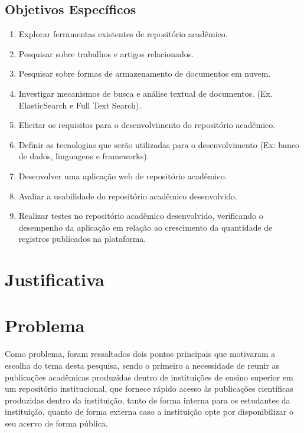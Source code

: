 \subsection{Objetivos Específicos}
\begin{enumerate}
    \item Explorar ferramentas existentes de repositório acadêmico.
    \item Pesquisar sobre trabalhos e artigos relacionados.
    \item Pesquisar sobre formas de armazenamento de documentos em nuvem.
    \item Investigar mecanismos de busca e análise textual de documentos. (Ex. ElasticSearch e Full Text Search).
    \item Elicitar os requisitos para o desenvolvimento do repositório acadêmico.
    \item Definir as tecnologias que serão utilizadas para o desenvolvimento (Ex: banco de dados, linguagens e frameworks).
    \item Desenvolver uma aplicação web de repositório acadêmico.
    \item Avaliar a usabilidade do repositório acadêmico desenvolvido.
    \item Realizar testes no repositório acadêmico desenvolvido, verificando o desempenho da aplicação em relação ao crescimento da quantidade de registros publicados na plataforma.

\end{enumerate}


\section{Justificativa}\label{sec:justification}



\section{Problema} \label{sec::Problem}

Como problema, foram ressaltados dois pontos principais que motivaram a escolha do tema desta pesquisa, sendo o primeiro a necessidade de reunir as publicações acadêmicas produzidas dentro de instituições de ensino superior em um repositório institucional, que fornece rápido acesso às publicações científicas produzidas dentro da instituição, tanto de forma interna para os estudantes da instituição, quanto de forma externa caso a instituição opte por disponibilizar o seu acervo de forma pública.

